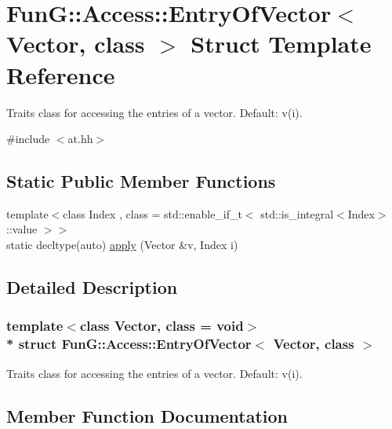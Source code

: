 \hypertarget{structFunG_1_1Access_1_1EntryOfVector}{}\section{FunG\+:\+:Access\+:\+:Entry\+Of\+Vector$<$ Vector, class $>$ Struct Template Reference}
\label{structFunG_1_1Access_1_1EntryOfVector}


Traits class for accessing the entries of a vector. Default\+: v(i).  




{\ttfamily \#include $<$at.\+hh$>$}

\subsection*{Static Public Member Functions}
\begin{DoxyCompactItemize}
\item 
{\footnotesize template$<$class Index , class  = std\+::enable\+\_\+if\+\_\+t$<$ std\+::is\+\_\+integral$<$\+Index$>$\+::value $>$$>$ }\\static decltype(auto) \hyperlink{structFunG_1_1Access_1_1EntryOfVector_a218d92e05d43db99ae2ef41bf390fe17}{apply} (Vector \&v, Index i)
\end{DoxyCompactItemize}


\subsection{Detailed Description}
\subsubsection*{template$<$class Vector, class = void$>$\\*
struct Fun\+G\+::\+Access\+::\+Entry\+Of\+Vector$<$ Vector, class $>$}

Traits class for accessing the entries of a vector. Default\+: v(i). 

\subsection{Member Function Documentation}
